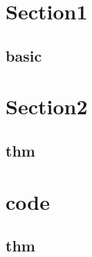 \section{Section1}
    \subsection{basic}
        

\section{Section2}
    \subsection{thm}
        

\section{code}
    \subsection{thm}
        
